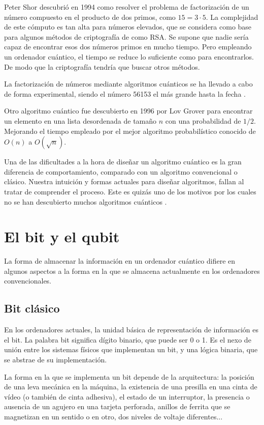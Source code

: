 Peter Shor descubrió en 1994 \cite{shor97} como resolver el problema de 
factorización de un número compuesto en el producto de dos primos, como $15 = 
3\cdot5$. La complejidad de este cómputo es tan alta para números elevados, que 
se considera como base para algunos métodos de criptografía de como RSA. Se 
supone que nadie sería capaz de encontrar esos dos números primos en mucho 
tiempo. Pero empleando un ordenador cuántico, el tiempo se reduce lo suficiente 
como para encontrarlos. De modo que la criptografía tendría que buscar otros 
métodos.

La factorización de números mediante algoritmos cuánticos se ha llevado a cabo 
de forma experimental, siendo el número 56153 el más grande hasta la fecha 
\cite{factor}. 

Otro algoritmo cuántico fue descubierto en 1996 por Lov Grover \cite{grover96} 
para encontrar un elemento en una lista desordenada de tamaño $n$ con una 
probabilidad de $1/2$.  Mejorando el tiempo empleado por el mejor algoritmo 
probabilístico conocido de $O(n)$ a $O(\sqrt{n})$.

Una de las dificultades a la hora de diseñar un algoritmo cuántico es la gran 
diferencia de comportamiento, comparado con un algoritmo convencional o clásico.  
Nuestra intuición y formas actuales para diseñar algoritmos, fallan al tratar de 
comprender el proceso. Este es quizás uno de los motivos por los cuales no se 
han descubierto muchos algoritmos cuánticos \cite{shor03}.

\section{El bit y el qubit}
La forma de almacenar la información en un ordenador cuántico difiere en algunos 
aspectos a la forma en la que se almacena actualmente en los ordenadores 
convencionales.

\subsection{Bit clásico}
En los ordenadores actuales, la unidad básica de representación de información 
es el bit. La palabra bit significa dígito binario, que puede ser 0 o 1. Es el 
nexo de unión entre los sistemas físicos que implementan un bit, y una lógica 
binaria, que se abstrae de su implementación.

La forma en la que se implementa un bit depende de la arquitectura: la posición 
de una leva mecánica en la máquina, la existencia de una presilla en una cinta 
de vídeo (o también de cinta adhesiva), el estado de un interruptor, la 
presencia o ausencia de un agujero en una tarjeta perforada, anillos de ferrita 
que se magnetizan en un sentido o en otro, dos niveles de voltaje diferentes...

